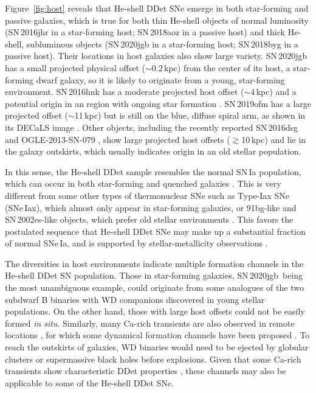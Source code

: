 \documentclass[twocolumn]{aastex631}
\newcommand{\sn}{SN\,2020jgb}
\begin{document}
\begin{CJK*}{UTF8}{gbsn}
Figure~\ref{fig:host} reveals that He-shell DDet SNe emerge in both star-forming and passive galaxies, which is true for both thin He-shell objects of normal luminosity (SN\,2016jhr in a star-forming host; SN\,2018aoz in a passive host) and thick He-shell, subluminous objects (SN\,2020jgb in a star-forming host; SN\,2018byg in a passive host). Their locations in host galaxies also show large variety. SN\,2020jgb has a small projected physical offset ($\sim$0.2\,kpc) from the center of its host, a star-forming dwarf galaxy, so it is likely to originate from a young, star-forming environment. SN\,2016hnk has a moderate projected host offset ($\sim$4\,kpc) and a potential origin in an  region with ongoing star formation \citep{galbany_16hnk_2019}. SN\,2019ofm has a large projected offset ($\sim$11\,kpc) but is still on the blue, diffuse spiral arm, as shown in its DECaLS image \citep{Dey_2019}. Other objects, including the recently reported SN\,2016dsg and OGLE-2013-SN-079 \citep{Dong_16dsg_2022}, show large projected host offsets ($\gtrsim$10\,kpc) and lie in the galaxy outskirts, which usually indicates origin in an old stellar population.

In this sense, the He-shell DDet sample resembles the normal SN\,Ia population, which can occur in both star-forming and quenched galaxies \citep[e.g.,][]{Sullivan_2006, Smith_2012}. This is very different from some other types of thermonuclear SNe such as Type-Iax SNe (SNe\,Iax), which almost only appear in star-forming galaxies, or 91bg-like and SN\,2002es-like \citep[02es-like;][]{Ganeshalingam_2012} objects, which prefer old stellar environments \citep[see the review by][]{Jha_2019}. This favors the postulated sequence that He-shell DDet SNe may make up a substantial fraction of normal SNe\,Ia, and is supported by stellar-metallicity observations \citep{Sanders_2021, Eitner_2022}.

The diversities in host environments indicate multiple formation channels in the He-shell DDet SN population. Those in star-forming galaxies, \sn\ being the most unambiguous example, could originate from some analogues of the two subdwarf B binaries with WD companions \citep{Geier_2013, Kupfer_2022} discovered in young stellar populations.
On the other hand, those with large host offsets could not be easily formed {\it in situ}. Similarly, many Ca-rich transients are also observed in remote locations \citep[e.g.,][]{Lunnan_2017}, for which some dynamical formation channels have been proposed \citep{Lyman_2014}. To reach the outskirts of galaxies, WD binaries would need to be ejected by globular clusters \citep{Shen_2019} or supermassive black holes \citep{Foley_2015} before explosions. Given that some Ca-rich transients show characteristic DDet properties \citep{de_Ca_rich_2020}, these channels may also be applicable to some of the He-shell DDet SNe. 


\end{CJK*}
\end{document}
